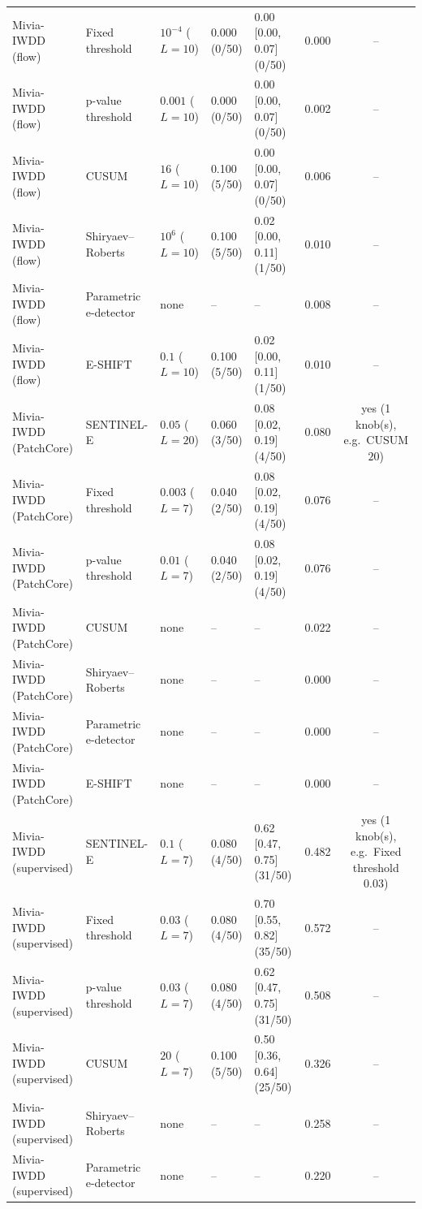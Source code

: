 \begin{table}[p]
{\begin{tabular}{llllllc}
Mivia-IWDD (flow) & Fixed threshold & $10^{-4}$ ($L=10$) & 0.000 (0/50) & 0.00 [0.00, 0.07] (0/50) & 0.000 & -- \\
Mivia-IWDD (flow) & p-value threshold & $0.001$ ($L=10$) & 0.000 (0/50) & 0.00 [0.00, 0.07] (0/50) & 0.002 & -- \\
Mivia-IWDD (flow) & CUSUM & $16$ ($L=10$) & 0.100 (5/50) & 0.00 [0.00, 0.07] (0/50) & 0.006 & -- \\
Mivia-IWDD (flow) & Shiryaev--Roberts & $10^{6}$ ($L=10$) & 0.100 (5/50) & 0.02 [0.00, 0.11] (1/50) & 0.010 & -- \\
Mivia-IWDD (flow) & Parametric e-detector & none & -- & -- & 0.008 & -- \\
Mivia-IWDD (flow) & E-SHIFT & $0.1$ ($L=10$) & 0.100 (5/50) & 0.02 [0.00, 0.11] (1/50) & 0.010 & -- \\
Mivia-IWDD (PatchCore) & SENTINEL-E & $0.05$ ($L=20$) & 0.060 (3/50) & 0.08 [0.02, 0.19] (4/50) & 0.080 & yes (1 knob(s), e.g.\ CUSUM $20$) \\
Mivia-IWDD (PatchCore) & Fixed threshold & $0.003$ ($L=7$) & 0.040 (2/50) & 0.08 [0.02, 0.19] (4/50) & 0.076 & -- \\
Mivia-IWDD (PatchCore) & p-value threshold & $0.01$ ($L=7$) & 0.040 (2/50) & 0.08 [0.02, 0.19] (4/50) & 0.076 & -- \\
Mivia-IWDD (PatchCore) & CUSUM & none & -- & -- & 0.022 & -- \\
Mivia-IWDD (PatchCore) & Shiryaev--Roberts & none & -- & -- & 0.000 & -- \\
Mivia-IWDD (PatchCore) & Parametric e-detector & none & -- & -- & 0.000 & -- \\
Mivia-IWDD (PatchCore) & E-SHIFT & none & -- & -- & 0.000 & -- \\
Mivia-IWDD (supervised) & SENTINEL-E & $0.1$ ($L=7$) & 0.080 (4/50) & 0.62 [0.47, 0.75] (31/50) & 0.482 & yes (1 knob(s), e.g.\ Fixed threshold $0.03$) \\
Mivia-IWDD (supervised) & Fixed threshold & $0.03$ ($L=7$) & 0.080 (4/50) & 0.70 [0.55, 0.82] (35/50) & 0.572 & -- \\
Mivia-IWDD (supervised) & p-value threshold & $0.03$ ($L=7$) & 0.080 (4/50) & 0.62 [0.47, 0.75] (31/50) & 0.508 & -- \\
Mivia-IWDD (supervised) & CUSUM & $20$ ($L=7$) & 0.100 (5/50) & 0.50 [0.36, 0.64] (25/50) & 0.326 & -- \\
Mivia-IWDD (supervised) & Shiryaev--Roberts & none & -- & -- & 0.258 & -- \\
Mivia-IWDD (supervised) & Parametric e-detector & none & -- & -- & 0.220 & -- \\

\end{tabular}}
\end{table}
